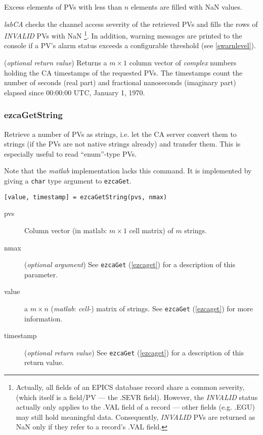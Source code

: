 \documentclass{article}
\newcommand{\sca}{{\em labCA}}
\newcommand{\matlab}{{\em matlab}}
\newcommand{\com}[1]{{\tt #1}}
\newcommand{\NAN}{\mbox{NaN}}
\newcommand{\PVITEM}{
\item[pvs] Column vector (in matlab: $m\times 1$ cell matrix)
of $m$ strings.
}
\begin{document}
\begin{description}
Excess elements of PVs with less than $n$ elements are filled with
\NAN{} values.

\sca{} checks the channel access severity of the retrieved PVs and
fills the rows of {\em INVALID} PVs with \NAN%
\footnote{
Actually, all fields of an EPICS database record share a common
severity, (which itself is a field/PV --- the .SEVR field). However,
the {\em INVALID} status actually only applies to the .VAL field
of a record --- other fields (e.g. .EGU) may still hold meaningful data.
Consequently, {\em INVALID} PVs are returned as \NAN{} only if
they refer to a record's .VAL field.
}. In addition, warning
messages are printed to the console if a PV's alarm status exceeds
a configurable threshold (see \ref{swarnlevel}).
%
%
\item[timestamp] ({\em optional return value}) Returns a $m\times 1$
column vector of {\em complex} numbers holding the CA timestamps of
the requested PVs. The timestamps count the number of seconds (real part)
and fractional nanoseconds (imaginary part) elapsed since
00:00:00 UTC, January 1, 1970.
\end{description}

\subsubsection{ezcaGetString}
\label{getstring}
Retrieve a number of PVs as strings, i.e. let the CA server convert
them to strings (if the PVs are not native strings already) and transfer
them. This is especially useful to read ``enum''-type PVs.

Note that the \matlab{} implementation lacks this command. It is implemented
by giving a \com{char}{} type argument to \com{ezcaGet}.
\begin{verbatim}
[value, timestamp] = ezcaGetString(pvs, nmax)
\end{verbatim}
\begin{description}
\PVITEM
%
%
\item[nmax] ({\em optional argument})
See \com{ezcaGet}{} (\ref{ezcaget}) for a description of this parameter.
\item[value] a $m\times n$ (\matlab: {\em cell}-) matrix of strings. See \com{ezcaGet}{}
(\ref{ezcaget}) for more information.
\item[timestamp] ({\em optional return value})
See \com{ezcaGet}{} (\ref{ezcaget}) for a description of this return value.
\end{description}
\end{document}
